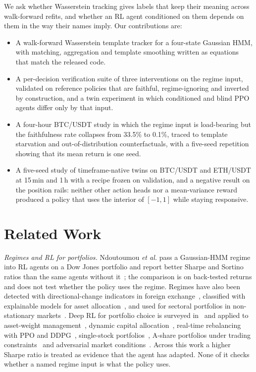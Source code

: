 \documentclass[conference]{IEEEtran}
\begin{document}
We ask whether Wasserstein tracking gives labels that keep their meaning across walk-forward refits, and whether an RL agent conditioned on them depends on them in the way their names imply. Our contributions are:
\begin{itemize}
  \item A walk-forward Wasserstein template tracker for a four-state Gaussian HMM, with matching, aggregation and template smoothing written as equations that match the released code.
  \item A per-decision verification suite of three interventions on the regime input, validated on reference policies that are faithful, regime-ignoring and inverted by construction, and a twin experiment in which conditioned and blind PPO agents differ only by that input.
  \item A four-hour BTC/USDT study in which the regime input is load-bearing but the faithfulness rate collapses from 33.5\% to 0.1\%, traced to template starvation and out-of-distribution counterfactuals, with a five-seed repetition showing that its mean return is one seed.
  \item A five-seed study of timeframe-native twins on BTC/USDT and ETH/USDT at 15\,min and 1\,h with a recipe frozen on validation, and a negative result on the position rails: neither other action heads nor a mean-variance reward produced a policy that uses the interior of $[-1,1]$ while staying responsive.
\end{itemize}

\section{Related Work}
\emph{Regimes and RL for portfolios.} Ndoutoumou \emph{et al.} pass a Gaussian-HMM regime into RL agents on a Dow Jones portfolio and report better Sharpe and Sortino ratios than the same agents without it~\cite{ndoutoumou2025hmm}; the comparison is on back-tested returns and does not test whether the policy uses the regime. Regimes have also been detected with directional-change indicators in foreign exchange~\cite{tsang2018regime}, classified with explainable models for asset allocation~\cite{zhang2020regimealloc}, and used for sectoral portfolios in non-stationary markets~\cite{zhang2025regimefolio}. Deep RL for portfolio choice is surveyed in~\cite{mortaji2024review,rout2026review} and applied to asset-weight management~\cite{wang2022drl}, dynamic capital allocation~\cite{tamuly2024drl}, real-time rebalancing with PPO and DDPG~\cite{naik2025realtime}, single-stock portfolios~\cite{huang2025singlestock}, A-share portfolios under trading constraints~\cite{gao2025drl} and adversarial market conditions~\cite{shrirao2025adversarial}. Across this work a higher Sharpe ratio is treated as evidence that the agent has adapted. None of it checks whether a named regime input is what the policy uses.
\end{document}
